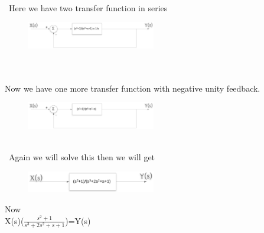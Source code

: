 \documentclass[journal,12pt,twocolumn]{IEEEtran}
\renewcommand\thesection{\arabic{section}}
\begin{document}
\begin{enumerate}[label=\arabic*.,ref=\thesection.\theenumi]
\begin{figure}[h]
\end{figure}
\\\
Here we have two transfer function in series 
\begin{figure}[h]
\includegraphics[width=0.5\textwidth]{./figs/pic5.eps}
\end{figure}
\\\\
Now we have one more transfer function with negative unity feedback.
\begin{figure}[h]
\includegraphics[width=0.5\textwidth]{./figs/pic6.eps}
\end{figure}
\\\
Again we will solve this then we will get
\begin{figure}[h]
\includegraphics[width=0.5\textwidth]{./figs/pic8.eps}
\end{figure}

Now\\

X(s)($\frac{s^2+1}{s^3+2s^2+s+1}$)=Y(s)\\


\end{enumerate}
\end{document}
